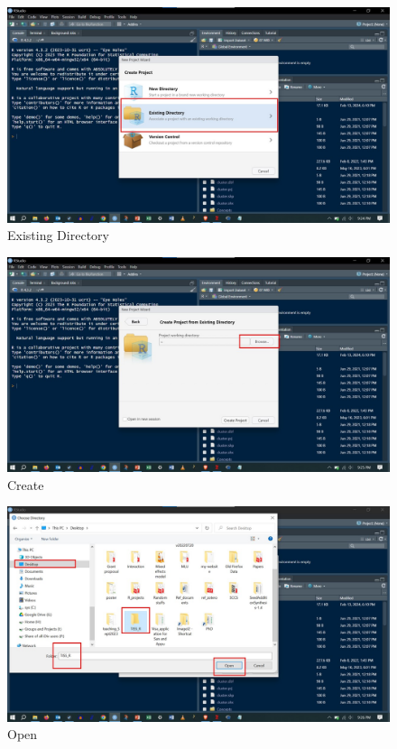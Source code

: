 \documentclass[
]{book}
\begin{document}
\begin{figure}

{\centering \includegraphics[width=0.7\linewidth]{pictures/Slide8} 

}

\caption{Existing Directory}\label{fig:unnamed-chunk-6}
\end{figure}

\begin{figure}

{\centering \includegraphics[width=0.7\linewidth]{pictures/Slide9} 

}

\caption{Create}\label{fig:unnamed-chunk-7}
\end{figure}

\begin{figure}

{\centering \includegraphics[width=0.7\linewidth]{pictures/Slide10} 

}

\caption{Open}\label{fig:unnamed-chunk-8}
\end{figure}
\end{document}
